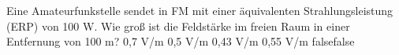     {Eine Amateurfunkstelle sendet in FM mit einer äquivalenten Strahlungsleistung (ERP) von 100 W. Wie groß ist die Feldstärke im freien Raum in einer Entfernung von 100 m?}
    {0,7 V/m}
    {0,5 V/m}
    {0,43 V/m}
    {0,55 V/m}
    {false}{false}